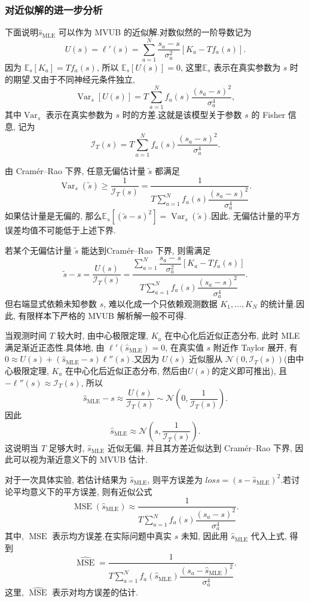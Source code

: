 ﻿\documentclass[UTF8,  zihao=-4]{ctexart}
\begin{document}
\subsubsection{对近似解的进一步分析}
下面说明$\hat s_{\mathrm{MLE}}$ 可以作为 MVUB 的近似解.对数似然的一阶导数记为
\[
    U(s)
    =
    \ell'(s)
    =
    \sum_{a=1}^N
    \frac{s_a-s}{\sigma_a^2}
    \left[
    K_a-Tf_a(s)
    \right].
\]
因为 $\mathbb E_s[K_a]=Tf_a(s)$, 所以 $\mathbb E_s[U(s)]=0$, 这里$\mathbb E_s$ 表示在真实参数为 $s$ 时的期望.又由于不同神经元条件独立, 
\[
    \operatorname{Var}_s[U(s)]
    =
    T\sum_{a=1}^N
    f_a(s)\frac{(s_a-s)^2}{\sigma_a^4}, 
\]
其中$\operatorname{Var}_s$ 表示在真实参数为 $s$ 时的方差.这就是该模型关于参数 $s$ 的 Fisher 信息, 记为
\[
    \mathcal I_T(s)
    =
    T\sum_{a=1}^N
    f_a(s)\frac{(s_a-s)^2}{\sigma_a^4}.
\]

由 Cramér--Rao 下界, 任意无偏估计量 $\tilde s$ 都满足
\[
    \operatorname{Var}_s(\tilde s)
    \geq
    \frac{1}{\mathcal I_T(s)}
    =
    \frac{1}{
    T\sum_{a=1}^N
    f_a(s)\dfrac{(s_a-s)^2}{\sigma_a^4}
    }.
\]
如果估计量是无偏的, 那么$\mathbb E_s[(\tilde s-s)^2]=\operatorname{Var}_s(\tilde s)$.因此, 无偏估计量的平方误差均值不可能低于上述下界.

若某个无偏估计量 $\tilde s$ 能达到Cramér--Rao 下界, 则需满足
\[
    \tilde s-s
    =
    \frac{U(s)}{\mathcal I_T(s)}
    =
    \frac{
    \sum_{a=1}^N
    \dfrac{s_a-s}{\sigma_a^2}
    \left[
    K_a-Tf_a(s)
    \right]
    }{
    T\sum_{a=1}^N
    f_a(s)\dfrac{(s_a-s)^2}{\sigma_a^4}
    }.
\]
但右端显式依赖未知参数 $s$, 难以化成一个只依赖观测数据 $K_1, \ldots,  K_N$ 的统计量.因此, 有限样本下严格的 MVUB 解析解一般不可得.

当观测时间 $T$ 较大时, 由中心极限定理,   $K_a$ 在中心化后近似正态分布, 此时 MLE 满足渐近正态性.具体地, 由 $\ell'(\hat s_{\mathrm{MLE}})=0$, 在真实值 $s$ 附近作 Taylor 展开, 有 $0\approx U(s)+(\hat s_{\mathrm{MLE}}-s)\ell''(s)$.又因为 $U(s)$ 近似服从 $\mathcal N(0, \mathcal I_T(s))$(由中心极限定理,  $K_a$ 在中心化后近似正态分布,  然后由$U(s)$的定义即可推出), 且 $-\ell''(s)\approx \mathcal I_T(s)$, 所以
\[
    \hat s_{\mathrm{MLE}}-s
    \approx
    \frac{U(s)}{\mathcal I_T(s)}
    \sim
    \mathcal N\left(
    0, 
    \frac{1}{\mathcal I_T(s)}
    \right).
\]
因此
\[
    \hat s_{\mathrm{MLE}}
    \approx
    \mathcal N\left(
    s, 
    \frac{1}{\mathcal I_T(s)}
    \right).
\]
这说明当 $T$ 足够大时, $\hat s_{\mathrm{MLE}}$ 近似无偏, 并且其方差近似达到 Cramér--Rao 下界, 因此可以视为渐近意义下的 MVUB 估计.

对于一次具体实验, 若估计结果为 $\hat s_{\mathrm{MLE}}$, 则平方误差为 $loss=(s-\hat s_{\mathrm{MLE}})^2$.若讨论平均意义下的平方误差, 则有近似公式
\[
    \operatorname{MSE}(\hat s_{\mathrm{MLE}})
    \approx
    \frac{1}{
    T\sum_{a=1}^N
    f_a(s)\dfrac{(s_a-s)^2}{\sigma_a^4}
    }.
\]
其中, $\operatorname{MSE}$ 表示均方误差.在实际问题中真实 $s$ 未知, 因此用 $\hat s_{\mathrm{MLE}}$ 代入上式, 得到
\[
    \widehat{\operatorname{MSE}}
    =
    \frac{1}{
    T\sum_{a=1}^N
    f_a(\hat s_{\mathrm{MLE}})
    \dfrac{(s_a-\hat s_{\mathrm{MLE}})^2}{\sigma_a^4}
    }.
\]
这里, $\widehat{\operatorname{MSE}}$ 表示对均方误差的估计.
\end{document}
